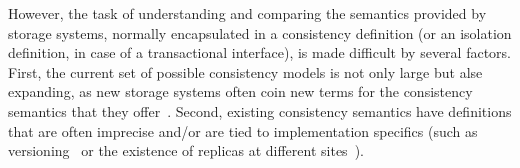 \documentclass{sig-alternate-05-2015}
\begin{document}
However, the task of understanding and comparing the semantics provided by storage systems, normally encapsulated in a consistency definition (or an isolation definition, in case of a transactional interface), is made difficult by several factors. First, the current set of possible consistency models is not only large but alse expanding, as new storage systems often coin new terms for the consistency semantics that they offer~\cite{pnuts, cops, cassandra}.
Second, existing consistency semantics have definitions that are often imprecise and/or are tied to implementation specifics (such as versioning~\cite{DBLP:conf/icde/AdyaLO00} or the existence of replicas at different sites~\cite{redblue}).
\end{document}
